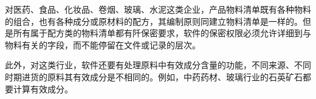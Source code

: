 \begin{enumerate}
        对医药、食品、化妆品、卷烟、玻璃、水泥这类企业，产品物料清单既有各种物料的组合，也有各种成分或原材料的配方，其编制原则同建立物料清单是一样的。但是所有属于配方类的物料清单都有阡保密要求，软件的保密权限必须允许详细到与物料有关的字段，而不能停留在文件或记录的层次。

        此外，对这类行业，软件还要有处理原料中有效成分含量的功能，不同来源、不同时期进货的原料其有效成分是不相同的。例如，中药药材、玻璃行业的石英矿石都要计算有效成分。
\end{enumerate}
